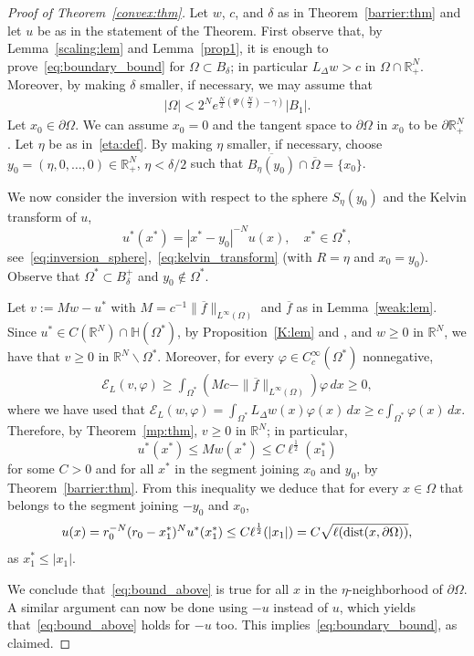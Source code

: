 \documentclass[11pt]{article}
\newcommand{\R}{\mathbb{R}}
\numberwithin{equation}{section}
\newcommand{\cE}{{\mathcal E}}
\newcommand{\cH}{{\mathbb H}}
\DeclareMathOperator{\dist}{\rm dist}
\begin{document}
\begin{proof}[Proof of Theorem~\ref{convex:thm}]
Let $w$, $c$, and $\delta$ as in Theorem~\ref{barrier:thm} and let $u$ be as in the statement of the Theorem. First observe that, by Lemma~\ref{scaling:lem} and Lemma~\ref{prop1}, it is enough to prove~\eqref{eq:boundary_bound} for $\Omega \subset B_\delta$; in particular $L_\Delta w > c$ in $\Omega\cap \R^N_+$. Moreover, by making $\delta$ smaller, if necessary, we may assume that 
\begin{align*}
|\Omega|<2^Ne^{\frac{N}{2} \left(\Psi \left(\frac{N}{2} \right) -\gamma \right)}|B_1|.
\end{align*}
Let $x_0 \in \partial \Omega$. We can assume $x_0=0$ and the tangent space to $\partial \Omega$ in $x_0$ to be $\partial \R_+^N$.  Let $\eta$ be as in~\eqref{eta:def}. By making $\eta$ smaller, if necessary, choose $y_0=(\eta,0,\dots,0) \in \R_+^N$, $\eta<\delta/2$ such that $\overline{B_{\eta}(y_0)} \cap \overline{\Omega} = \{ x_0 \}$.

We now consider the inversion with respect to the sphere $S_{\eta}(y_0)$ and the Kelvin transform of $u$,
\begin{equation*}
    u^*(x^*) = |x^*-y_0|^{-N} u(x), \quad x^* \in \Omega^*,
\end{equation*}
see~\eqref{eq:inversion_sphere},~\eqref{eq:kelvin_transform} (with $R=\eta$ and $x_0=y_0$). Observe that $\Omega^* \subset B_\delta^+$ and $y_0\not\in \Omega^*$.

Let $v:=Mw-u^*$ with $M=c^{-1}\|\overline{f}\|_{L^\infty(\Omega)}$ and $\overline{f}$ as in Lemma~\ref{weak:lem}.  Since $u^*\in C(\R^N)\cap \cH(\Omega^*)$, by Proposition~\ref{K:lem} and \cite[Theorem 1.11]{CW19}, and $w\geq 0$ in $\R^N$, we have that $v\geq 0$ in $\R^N\backslash\Omega^*$. Moreover, for every $\varphi\in C^\infty_c(\Omega^*)$ nonnegative,
\begin{align*}
\cE_L(v,\varphi)\geq  \int_{\Omega^*} (Mc-\|\overline{f}\|_{L^\infty(\Omega)})\varphi\, dx\geq 0,
\end{align*}
where we have used that
$\cE_L(w,\varphi)
=\int_{\Omega^*} L_\Delta w(x)\varphi(x)\, dx\geq c\int_{\Omega^*}\varphi(x)\, dx.
$ Therefore, by Theorem~\ref{mp:thm}, $v\geq0$ in $\R^N$; in particular,
\begin{equation*}
 u^*(x^*) \leq M w(x^*) \leq C \ell^\frac{1}{2}(x_1^*)
\end{equation*}
for some $C>0$ and for all $x^*$ in the segment joining $x_0$ and $y_0$, by Theorem~\ref{barrier:thm}. From this inequality we deduce that for every $x \in \Omega$ that belongs to the segment joining $-y_0$ and $x_0$,
\begin{equation} \label{eq:bound_above}
    u(x) = r_0^{-N}(r_0-x_1^*)^N u^*(x_1^*) \leq C \ell^\frac{1}{2}(|x_1|)= C\sqrt{\ell(\dist(x,\partial \Omega))},
\end{equation}
as $x_1^* \le |x_1|$.

We conclude that~\eqref{eq:bound_above} is true for all $x$ in the $\eta$-neighborhood of $\partial \Omega$.  A similar argument can now be done using $-u$ instead of $u$, which yields that~\eqref{eq:bound_above} holds for $-u$ too. This implies~\eqref{eq:boundary_bound}, as claimed.
\end{proof}
\end{document}
